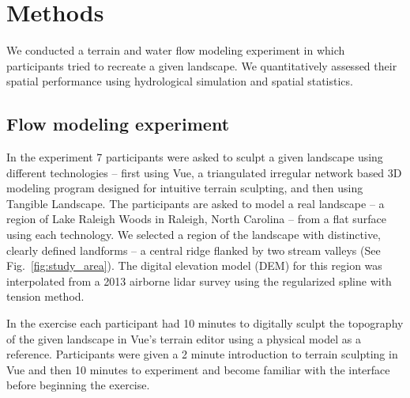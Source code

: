 \documentclass{isprs}
\begin{document}

\section{Methods}\label{sec:methods}
%
We conducted a terrain and water flow modeling experiment 
in which participants tried to recreate a given landscape. 
%
We quantitatively assessed their spatial performance using hydrological simulation and spatial statistics.


\subsection{Flow modeling experiment}
%
In the experiment 7 participants were asked to sculpt a given landscape using different technologies -- 
first using Vue, a triangulated irregular network based 3D modeling program designed for intuitive terrain sculpting, 
and then using Tangible Landscape. 
%
The participants are asked to model a real landscape --
a region of Lake Raleigh Woods 
in Raleigh, North Carolina  -- 
from a flat surface using each technology. 
We selected a region of the landscape with distinctive, 
clearly defined landforms -- a central ridge flanked by two stream valleys 
(See Fig.~\ref{fig:study_area}). 
The digital elevation model (DEM) for this region was interpolated from a 2013 airborne lidar survey using the regularized spline with tension method.


In the  exercise 
each participant had 10 minutes to digitally sculpt the topography of the given landscape in Vue's terrain editor
using a physical model as a reference. 
Participants were given a 2 minute introduction to terrain sculpting in Vue and then 10 minutes to experiment and become familiar with the interface before beginning the exercise.
\end{document}
